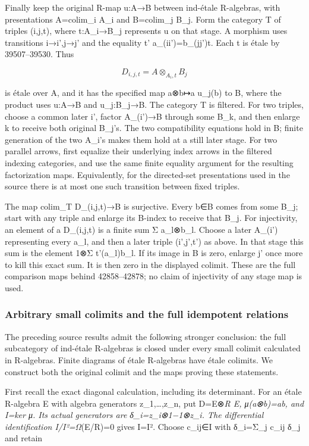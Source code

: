 Finally keep the original R-map u:A→B between ind-étale R-algebras, with presentations A=colim\_i A\_i and B=colim\_j B\_j. Form the category T of triples (i,j,t), where t:A\_i→B\_j represents u on that stage. A morphism uses transitions i→i',j→j' and the equality t' a\_(ii')=b\_(jj')t. Each t is étale by 39507--39530. Thus

\[
D_{i,j,t}=A\otimes_{A_i,t}B_j
\]

is étale over A, and it has the specified map a⊗b↦a u\_j(b) to B, where the product uses u:A→B and u\_j:B\_j→B. The category T is filtered. For two triples, choose a common later i', factor A\_(i')→B through some B\_k, and then enlarge k to receive both original B\_j's. The two compatibility equations hold in B; finite generation of the two A\_i's makes them hold at a still later stage. For two parallel arrows, first equalize their underlying index arrows in the filtered indexing categories, and use the same finite equality argument for the resulting factorization maps. Equivalently, for the directed-set presentations used in the source there is at most one such transition between fixed triples.

The map colim\_T D\_(i,j,t)→B is surjective. Every b∈B comes from some B\_j; start with any triple and enlarge its B-index to receive that B\_j. For injectivity, an element of a D\_(i,j,t) is a finite sum Σ a\_l⊗b\_l. Choose a later A\_(i') representing every a\_l, and then a later triple (i',j',t') as above. In that stage this sum is the element 1⊗Σ t'(a\_l)b\_l. If its image in B is zero, enlarge j' once more to kill this exact sum. It is then zero in the displayed colimit. These are the full comparison maps behind 42858--42878; no claim of injectivity of any stage map is used.

\subsubsection{Arbitrary small colimits and the full idempotent relations}\label{arbitrary-small-colimits-and-the-full-idempotent-relations}

The preceding source results admit the following stronger conclusion: the full subcategory of ind-étale R-algebras is closed under every small colimit calculated in R-algebras. Finite diagrams of étale R-algebras have étale colimits. We construct both the original colimit and the maps proving these statements.

First recall the exact diagonal calculation, including its determinant. For an étale R-algebra E with algebra generators z\_1,\ldots,z\_n, put D=E⊗\emph{R E, μ(a⊗b)=ab, and I=ker μ. Its actual generators are δ\_i=z\_i⊗1−1⊗z\_i. The differential identification I/I²=Ω}(E/R)=0 gives I=I². Choose c\_ij∈I with δ\_i=Σ\_j c\_ij δ\_j and retain

